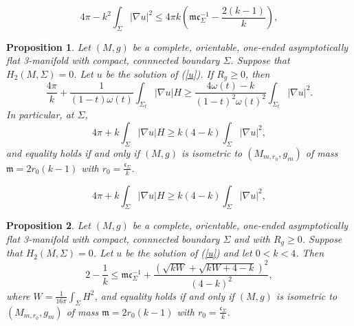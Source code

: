 \documentclass[10pt,a4paper]{amsart}
\newtheorem{proposition}{Proposition}
\begin{document}
	\begin{equation}\label{lim B0}
	4\pi-k^{2}\int_{\Sigma}|\nabla u|^{2}\leq 4\pi k (\mathfrak{m}\mathfrak{c}_{\Sigma}^{-1}-\frac{2(k-1)}{k}),
	\end{equation}

\begin{proposition}\label{pro}
Let $ (M,g) $ be a complete, orientable, one-ended asymptotically flat 3-manifold with compact, connnected boundary $ \Sigma $. Suppose that $ H_{2}(M,\Sigma)=0 $. Let $ u $ be the solution of (\ref{u}). If $ R_{g}\geq 0 $, then
\begin{equation}\label{t cp}
\frac{4\pi}{k}+\frac{1}{(1-t)\omega(t)}\int_{\Sigma_{t}}|\nabla u|H\geq \frac{4\omega(t)-k}{(1-t)^{2}\omega(t)^{2}}\int_{\Sigma_{t}}|\nabla u|^{2}.
\end{equation}
In particular, at $ \Sigma $,
\begin{equation}\label{0 cp}
4\pi+k\int_{\Sigma}|\nabla u|H\geq k(4-k)\int_{\Sigma}|\nabla u|^{2},
\end{equation}
and equality holds if and only if $ (M,g) $ is isometric to $ (M_{m,r_{0}},g_{m}) $ of mass $ \mathfrak{m}=2r_{0}(k-1) $ with $ r_{0}=\frac{\mathfrak{c}_{\Sigma}}{k} $.
\end{proposition}

\begin{equation}
4\pi+k\int_{\Sigma}|\nabla u|H\geq k(4-k)\int_{\Sigma}|\nabla u|^{2},
\end{equation}

\begin{proposition}\label{cor1}
Let $ (M,g) $ be a complete, orientable, one-ended asymptotically flat 3-manifold with compact, connnected boundary $ \Sigma $ and with $ R_{g}\geq 0 $. Suppose that $ H_{2}(M,\Sigma)=0 $. Let $ u $ be the solution of (\ref{u}) and let $ 0<k<4 $. Then
	\begin{equation}\label{willmore}
	2-\frac{1}{k}\leq \mathfrak{m}\mathfrak{c}_{\Sigma}^{-1}+\frac{(\sqrt{kW}+\sqrt{kW+4-k})^{2}}{(4-k)^{2}},
	\end{equation}
	where $ W=\frac{1}{16\pi}\int_{\Sigma}H^{2} $, and equality holds if and only if $ (M,g) $ is isometric to $ (M_{m,r_{0}},g_{m}) $ of mass $ \mathfrak{m}=2r_{0}(k-1) $ with $ r_{0}=\frac{\mathfrak{c}_{\Sigma}}{k} $.
\end{proposition}
\end{document}
